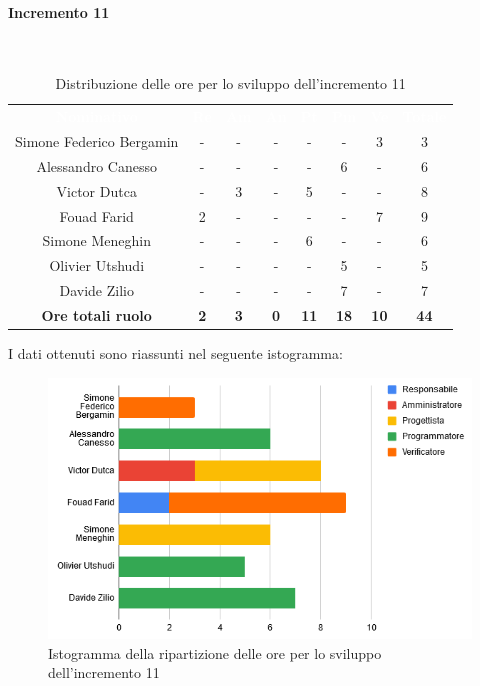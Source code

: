 \paragraph*{Incremento 11}\mbox{} \\
\begin{table}[H]
\centering\renewcommand{\arraystretch}{1.5}
\caption{Distribuzione delle ore per lo sviluppo dell'incremento 11}
\vspace{0.2cm}
\begin{tabular}{ c c c c c c c c }
\rowcolor{redafk}
\textcolor{white}{\textbf{Nominativo}} & \textcolor{white}{\textbf{Re}} &
\textcolor{white}{\textbf{Am}} & \textcolor{white}{\textbf{An}} &
\textcolor{white}{\textbf{Pt}} & \textcolor{white}{\textbf{Pm}} &
\textcolor{white}{\textbf{Ve}} & \textcolor{white}{\textbf{Totale}} \\
Simone Federico Bergamin & - & - & - & - & - & 3 & 3\\
Alessandro Canesso & - & - & - & - & 6 & - & 6 \\
Victor Dutca & - & 3 & - & 5 & - & - & 8 \\
Fouad Farid & 2 & - & - & - & - & 7 & 9 \\
Simone Meneghin & - & - & - & 6 & - & - & 6 \\
Olivier Utshudi & - & - & - & - & 5 & - & 5 \\
Davide Zilio & - & - & - & - & 7 & - & 7 \\
\rowcolor{lastrowcolor}
\textbf{Ore totali ruolo} & \textbf{2} & \textbf{3} & \textbf{0} & \textbf{11} & \textbf{18} & \textbf{10} & \textbf{44} \\
\end{tabular}
\end{table}

I dati ottenuti sono riassunti nel seguente istogramma:
\begin{figure}[H]
\centering
\includegraphics[scale=0.60]{img/grafici/tabella_inc11.png}
\caption{Istogramma della ripartizione delle ore per lo sviluppo dell'incremento 11}
\end{figure}

